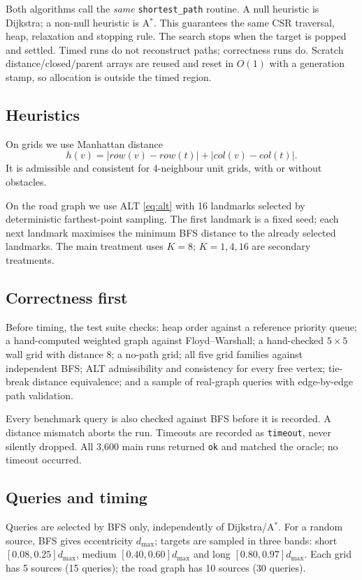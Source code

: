 \documentclass[conference,10pt]{IEEEtran}
\newcommand{\Astar}{A$^\ast$}
\newcommand{\code}[1]{\texttt{#1}}
\begin{document}
Both algorithms call the \emph{same} \code{shortest\_path} routine.  A null
heuristic is Dijkstra; a non-null heuristic is \Astar{}.  This guarantees the
same CSR traversal, heap, relaxation and stopping rule.  The search stops when
the target is popped and settled.  Timed runs do not reconstruct paths;
correctness runs do.  Scratch distance/closed/parent arrays are reused and reset
in $O(1)$ with a generation stamp, so allocation is outside the timed region.

\subsection{Heuristics}
On grids we use Manhattan distance
\begin{equation}
  h(v)=|\mathit{row}(v)-\mathit{row}(t)|+|\mathit{col}(v)-\mathit{col}(t)|.
\end{equation}
It is admissible and consistent for 4-neighbour unit grids, with or without
obstacles.

On the road graph we use ALT \eqref{eq:alt} with 16 landmarks selected by
deterministic farthest-point sampling.  The first landmark is a fixed seed;
each next landmark maximises the minimum BFS distance to the already selected
landmarks.  The main treatment uses $K=8$; $K=1,4,16$ are secondary treatments.

\subsection{Correctness first}
Before timing, the test suite checks: heap order against a reference priority
queue; a hand-computed weighted graph against Floyd--Warshall; a hand-checked
$5\times5$ wall grid with distance 8; a no-path grid; all five grid families
against independent BFS; ALT admissibility and consistency for every free
vertex; tie-break distance equivalence; and a sample of real-graph queries with
edge-by-edge path validation.

Every benchmark query is also checked against BFS before it is recorded.  A
distance mismatch aborts the run.  Timeouts are recorded as \code{timeout},
never silently dropped.  All 3,600 main runs returned \code{ok} and matched the
oracle; no timeout occurred.

\subsection{Queries and timing}
Queries are selected by BFS only, independently of Dijkstra/\Astar{}.  For a
random source, BFS gives eccentricity $d_{\max}$; targets are sampled in three
bands: short $[0.08,0.25]d_{\max}$, medium $[0.40,0.60]d_{\max}$ and long
$[0.80,0.97]d_{\max}$.  Each grid has 5 sources (15 queries); the road graph has
10 sources (30 queries).
\end{document}
